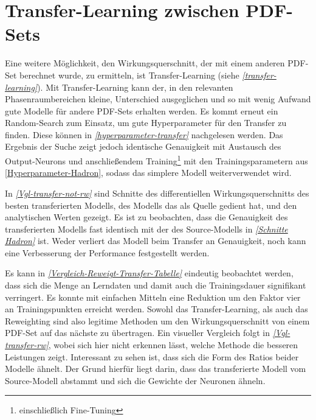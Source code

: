 \section{Transfer-Learning zwischen PDF-Sets}
Eine weitere Möglichkeit, den Wirkungsquerschnitt, der mit einem anderen PDF-Set berechnet wurde, zu ermitteln, ist Transfer-Learning (siehe \textit{\autoref{transfer-learning}}). Mit Transfer-Learning kann der, in den relevanten Phasenraumbereichen kleine, Unterschied ausgeglichen und so mit wenig Aufwand gute Modelle für andere PDF-Sets erhalten werden. Es kommt erneut ein Random-Search zum Einsatz, um gute Hyperparameter für den Transfer zu finden. Diese können in \textit{\autoref{hyperparameter-transfer}} nachgelesen werden. Das Ergebnis der Suche zeigt jedoch identische Genauigkeit mit Austausch des Output-Neurons und anschließendem Training\footnote{einschließlich Fine-Tuning} mit den Trainingsparametern aus \textsf{\autoref{Hyperparameter-Hadron}}, sodass das simplere Modell weiterverwendet wird.

In \textit{\autoref{Vgl-transfer-not-rw}} sind Schnitte des differentiellen Wirkungsquerschnitts des besten transferierten Modells, des Modells das als Quelle gedient hat, und den analytischen Werten gezeigt. Es ist zu beobachten, dass die Genauigkeit des transferierten Modells fast identisch mit der des Source-Modells in \textit{\autoref{Schnitte Hadron}} ist. Weder verliert das Modell beim Transfer an Genauigkeit, noch kann eine Verbesserung der Performance festgestellt werden.

Es kann in \textit{\autoref{Vergleich-Reweigt-Transfer-Tabelle}} eindeutig beobachtet werden, dass sich die Menge an Lerndaten und damit auch die Trainingsdauer signifikant verringert. Es konnte mit einfachen Mitteln eine Reduktion um den Faktor vier an Trainingspunkten erreicht werden. Sowohl das Transfer-Learning, als auch das Reweighting sind also legitime Methoden um den Wirkungsquerschnitt von einem PDF-Set auf das nächste zu übertragen. Ein visueller Vergleich folgt in \textit{\autoref{Vgl-transfer-rw}}, wobei sich hier nicht erkennen lässt, welche Methode die besseren Leistungen zeigt. Interessant zu sehen ist, dass sich die Form des Ratios beider Modelle ähnelt. Der Grund hierfür liegt darin, dass das transferierte Modell vom Source-Modell abstammt und sich die Gewichte der Neuronen ähneln.


